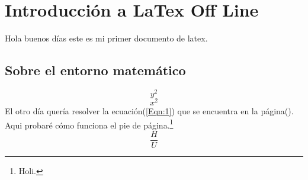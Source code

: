 \documentclass[10pt,letterpaper]{book}
\begin{document}
\part{Introducción a LaTex Off Line}
Hola buenos días este es mi primer documento de latex.\newpage
\chapter{Sobre el entorno matemático}
\begin{equation}
y^2
\end{equation}
\begin{equation}
x^2
\label{Eqn:1} 
\end{equation}
El otro día quería resolver la ecuación(\ref{Eqn:1}) que se encuentra en la página(\pageref{Eqn:1}).\\
Aqui probaré cómo funciona el pie de página.\footnote{Holi.}\\
$$\frac{H}{U}  $$
\end{document}

